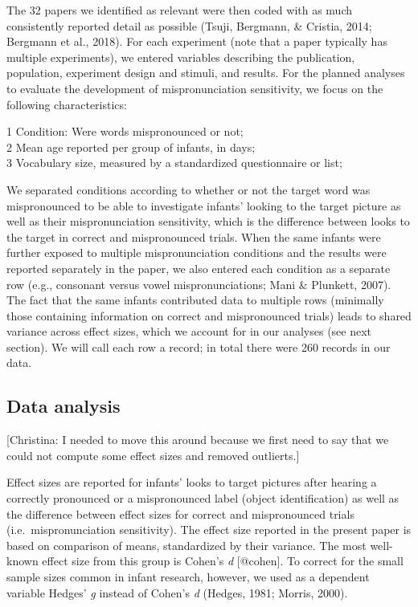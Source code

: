 \documentclass[man]{apa6}
\theoremstyle{definition}
\theoremstyle{definition}
\theoremstyle{definition}
\theoremstyle{remark}
\begin{document}
The 32 papers we identified as relevant were then coded with as much
consistently reported detail as possible (Tsuji, Bergmann, \& Cristia,
2014; Bergmann et al., 2018). For each experiment (note that a paper
typically has multiple experiments), we entered variables describing the
publication, population, experiment design and stimuli, and results. For
the planned analyses to evaluate the development of mispronunciation
sensitivity, we focus on the following characteristics:

1 Condition: Were words mispronounced or not;\\
2 Mean age reported per group of infants, in days;\\
3 Vocabulary size, measured by a standardized questionnaire or list;

We separated conditions according to whether or not the target word was
mispronounced to be able to investigate infants' looking to the target
picture as well as their mispronunciation sensitivity, which is the
difference between looks to the target in correct and mispronounced
trials. When the same infants were further exposed to multiple
mispronunciation conditions and the results were reported separately in
the paper, we also entered each condition as a separate row (e.g.,
consonant versus vowel mispronunciations; Mani \& Plunkett, 2007). The
fact that the same infants contributed data to multiple rows (minimally
those containing information on correct and mispronounced trials) leads
to shared variance across effect sizes, which we account for in our
analyses (see next section). We will call each row a record; in total
there were 260 records in our data.

\subsection{Data analysis}\label{data-analysis}

{[}Christina: I needed to move this around because we first need to say
that we could not compute some effect sizes and removed outlierts.{]}

Effect sizes are reported for infants' looks to target pictures after
hearing a correctly pronounced or a mispronounced label (object
identification) as well as the difference between effect sizes for
correct and mispronounced trials (i.e.~mispronunciation sensitivity).
The effect size reported in the present paper is based on comparison of
means, standardized by their variance. The most well-known effect size
from this group is Cohen's \emph{d} {[}@cohen{]}. To correct for the
small sample sizes common in infant research, however, we used as a
dependent variable Hedges' \emph{g} instead of Cohen's \emph{d} (Hedges,
1981; Morris, 2000).
\end{document}
